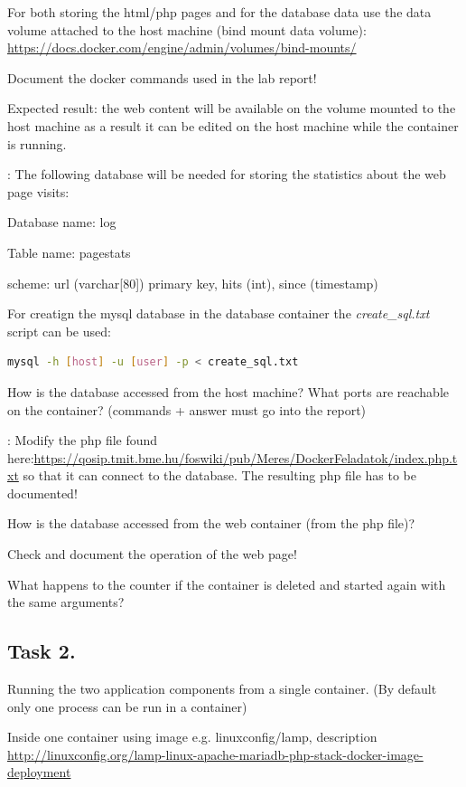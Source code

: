 \documentclass[a4paper]{article}
\begin{document}
For both storing the html/php pages and for the database data use the data volume attached to the host machine (bind mount data volume): \url{https://docs.docker.com/engine/admin/volumes/bind-mounts/}

Document the docker commands used in the lab report!

Expected result: the web content will be available on the volume mounted to the host machine as a result it can be edited on the host machine while the container is running.

\textbf{\emph{}}: The following database will be needed for storing the statistics about the web page visits:

Database name: log

Table name: pagestats

scheme:  url (varchar[80]) primary key, hits (int), since (timestamp)

For creatign the mysql database in the database container the \emph{create\_sql.txt} script can be used:
\begin{lstlisting}[language=bash,breaklines]mysql -h [host] -u [user] -p < create_sql.txt
\end{lstlisting}

How is the database accessed from the host machine? What ports are reachable on the container? (commands + answer must go into the report)


\textbf{\emph{}}:  Modify the php file found here:\url{https://qosip.tmit.bme.hu/foswiki/pub/Meres/DockerFeladatok/index.php.txt} so that it can connect to the database. The resulting php file has to be documented!

How is the database accessed from the web container (from the php file)?

Check and document the operation of the web page!

What happens to the counter if the container is deleted and started again with the same arguments?

\subsection{Task 2.}
Running the two application components from a single container. (By default only one process can be run in a container)

Inside one container using image e.g. linuxconfig/lamp, description \url{http://linuxconfig.org/lamp-linux-apache-mariadb-php-stack-docker-image-deployment}
\end{document}
